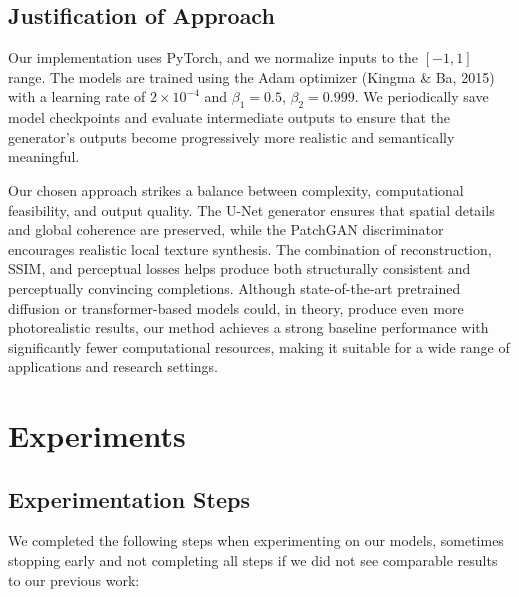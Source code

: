 \documentclass[sigconf]{acmart}
\begin{document}
\subsection*{Justification of Approach}
Our implementation uses PyTorch, and we normalize inputs to the $[-1, 1]$ range. The models are trained using the Adam optimizer (Kingma \& Ba, 2015) with a learning rate of $2 \times 10^{-4}$ and $\beta_1 = 0.5$, $\beta_2 = 0.999$. We periodically save model checkpoints and evaluate intermediate outputs to ensure that the generator’s outputs become progressively more realistic and semantically meaningful. 

Our chosen approach strikes a balance between complexity, computational feasibility, and output quality. The U-Net generator ensures that spatial details and global coherence are preserved, while the PatchGAN discriminator encourages realistic local texture synthesis. The combination of reconstruction, SSIM, and perceptual losses helps produce both structurally consistent and perceptually convincing completions. Although state-of-the-art pretrained diffusion or transformer-based models could, in theory, produce even more photorealistic results, our method achieves a strong baseline performance with significantly fewer computational resources, making it suitable for a wide range of applications and research settings.

\section*{Experiments}

\subsection*{Experimentation Steps}

We completed the following steps when experimenting on our models, sometimes stopping early and not completing all steps if we did not see comparable results to our previous work:
\end{document}
